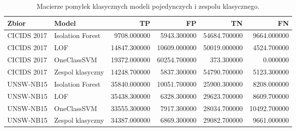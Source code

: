 \begin{table}
\caption{Macierze pomylek klasycznych modeli pojedynczych i zespolu klasycznego.}
\label{tab:classical_ensemble_confusion}
\begin{tabular}{llrrrr}
\toprule
Zbior & Model & TP & FP & TN & FN \\
\midrule
CICIDS 2017 & Isolation Forest & 9708.000000 & 5943.300000 & 54684.700000 & 9664.000000 \\
CICIDS 2017 & LOF & 14847.300000 & 10609.000000 & 50019.000000 & 4524.700000 \\
CICIDS 2017 & OneClassSVM & 19372.000000 & 60254.700000 & 373.300000 & 0.000000 \\
CICIDS 2017 & Zespol klasyczny & 14248.700000 & 5837.300000 & 54790.700000 & 5123.300000 \\
UNSW-NB15 & Isolation Forest & 35840.000000 & 10051.700000 & 25900.300000 & 8208.000000 \\
UNSW-NB15 & LOF & 35438.300000 & 6328.300000 & 29623.700000 & 8609.700000 \\
UNSW-NB15 & OneClassSVM & 33555.300000 & 7917.300000 & 28034.700000 & 10492.700000 \\
UNSW-NB15 & Zespol klasyczny & 34387.000000 & 6869.300000 & 29082.700000 & 9661.000000 \\
\bottomrule
\end{tabular}
\end{table}
